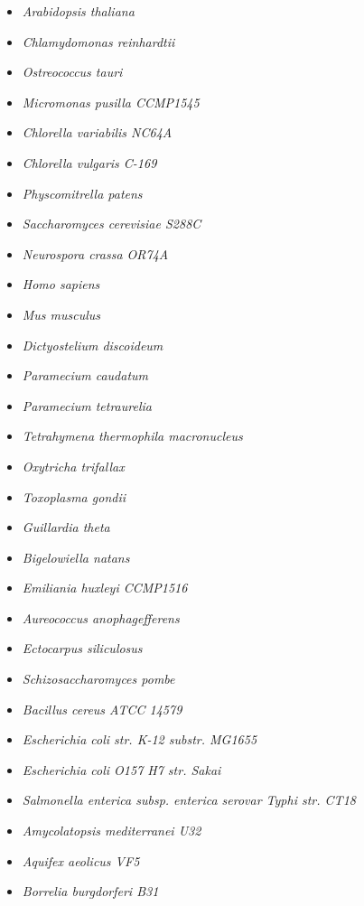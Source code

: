 \begin{itemize}
    \item		\textit{Arabidopsis thaliana} 
    \item		\textit{Chlamydomonas reinhardtii} 
    \item		\textit{Ostreococcus tauri} 
    \item		\textit{Micromonas pusilla CCMP1545}   
    \item		\textit{Chlorella variabilis NC64A} 
    \item		\textit{Chlorella vulgaris C-169} 
    \item		\textit{Physcomitrella patens} 
    \item		\textit{Saccharomyces cerevisiae S288C}  
    \item		\textit{Neurospora crassa OR74A}
    \item		\textit{Homo sapiens}
    \item		\textit{Mus musculus}
    \item		\textit{Dictyostelium discoideum}
    \item		\textit{Paramecium caudatum}
    \item		\textit{Paramecium tetraurelia}
    \item		\textit{Tetrahymena thermophila macronucleus}
    \item		\textit{Oxytricha trifallax}
    \item		\textit{Toxoplasma gondii}
    \item		\textit{Guillardia theta}
    \item		\textit{Bigelowiella natans}
    \item		\textit{Emiliania huxleyi CCMP1516}
    \item		\textit{Aureococcus anophagefferens}
    \item		\textit{Ectocarpus siliculosus}
    \item		\textit{Schizosaccharomyces pombe}
    \item		\textit{Bacillus cereus ATCC 14579}
    \item		\textit{Escherichia coli str. K-12 substr. MG1655}
    \item		\textit{Escherichia coli O157 H7 str. Sakai}
    \item		\textit{Salmonella enterica subsp. enterica serovar Typhi str. CT18}
    \item		\textit{Amycolatopsis mediterranei U32}
    \item		\textit{Aquifex aeolicus VF5}
    \item		\textit{Borrelia burgdorferi B31}

\end{itemize}
